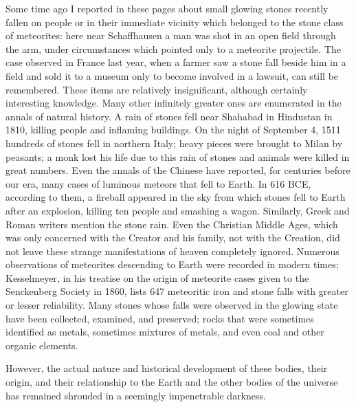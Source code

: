 \documentclass[a4paper, 12pt, oneside]{article}
\begin{document}
Some time ago I reported in these pages about small glowing stones recently fallen on people or in their immediate vicinity which belonged to the stone class of meteorites: here near Schaffhausen a man was shot in an open field through the arm, under circumstances which pointed only to a meteorite projectile. The case observed in France last year, when a farmer saw a stone fall beside him in a field and sold it to a museum only to become involved in a lawsuit, can still be remembered. These items are relatively insignificant, although certainly interesting knowledge. Many other infinitely greater ones are enumerated in the annals of natural history. A rain of stones fell near Shahabad in Hindustan in 1810, killing people and inflaming buildings. On the night of September 4, 1511 hundreds of stones fell in northern Italy; heavy pieces were brought to Milan by peasants; a monk lost his life due to this rain of stones and animals were killed in great numbers. Even the annals of the Chinese have reported, for centuries before our era, many cases of luminous meteors that fell to Earth. In 616 BCE, according to them, a fireball appeared in the sky from which stones fell to Earth after an explosion, killing ten people and smashing a wagon. Similarly, Greek and Roman writers mention the stone rain. Even the Christian Middle Ages, which was only concerned with the Creator and his family, not with the Creation, did not leave these strange manifestations of heaven completely ignored. Numerous observations of meteorites descending to Earth were recorded in modern times; Kesselmeyer, in his treatise on the origin of meteorite cases given to the Senckenberg Society in 1860, lists 647 meteoritic iron and stone falls with greater or lesser reliability. Many stones whose falls were observed in the glowing state have been collected, examined, and preserved; rocks that were sometimes identified as metals, sometimes mixtures of metals, and even coal and other organic elements.

However, the actual nature and historical development of these bodies, their origin, and their relationship to the Earth and the other bodies of the universe has remained shrouded in a seemingly impenetrable darkness.
\end{document}
